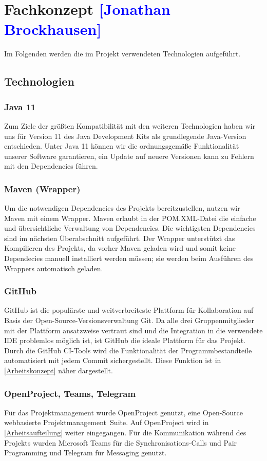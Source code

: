 

\section{Fachkonzept \textcolor{blue}{[Jonathan Brockhausen]}}
\label{Technologien}

Im Folgenden werden die im Projekt verwendeten Technologien aufgeführt.

\subsection{Technologien}

\subsubsection*{Java 11}
Zum Ziele der größten Kompatibilität mit den weiteren Technologien haben wir uns für Version 11 des Java Development Kits als grundlegende Java-Version entschieden. Unter Java 11 können wir die ordnungsgemäße Funktionalität unserer Software garantieren, ein Update auf neuere Versionen kann zu Fehlern mit den Dependencies führen.
\subsubsection*{Maven (Wrapper)}
Um die notwendigen Dependencies des Projekts bereitzustellen, nutzen wir Maven mit einem Wrapper. Maven erlaubt in der POM.XML-Datei die einfache und übersichtliche Verwaltung von Dependencies. Die wichtigsten Dependencies sind im nächsten Überabschnitt aufgeführt. Der Wrapper unterstützt das Kompilieren des Projekts, da vorher Maven geladen wird und somit keine Dependecies manuell installiert werden müssen; sie werden beim Ausführen des Wrappers automatisch geladen.
\subsubsection*{GitHub}
GitHub ist die populärste und weitverbreiteste Plattform für Kollaboration auf Basis der Open-Source-Versionsverwaltung Git. Da alle drei Gruppenmitglieder mit der Plattform ansatzweise vertraut sind und die Integration in die verwendete IDE problemlos möglich ist, ist GitHub die ideale Plattform für das Projekt. Durch die GitHub CI-Tools wird die Funktionalität der Programmbestandteile automatisiert mit jedem Commit sichergestellt. Diese Funktion ist in \cref{Arbeitskonzept} näher dargestellt.
\subsubsection*{OpenProject, Teams, Telegram}
Für das Projektmanagement wurde OpenProject genutzt, eine Open-Source webbasierte Projektmanagement~Suite. Auf OpenProject wird in \autoref{Arbeitsaufteilung} weiter eingegangen.
Für die Kommunikation während des Projekts wurden Microsoft Teams für die Synchronisations-Calls und Pair Programming und Telegram für Messaging genutzt.

